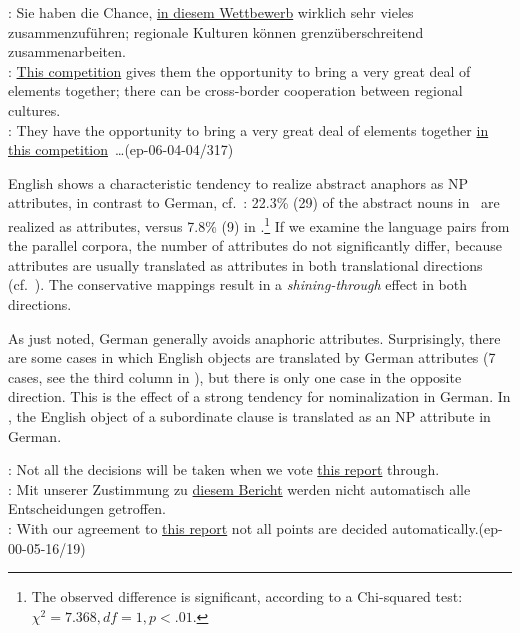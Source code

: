\documentclass[output=paper]{LSP/langsci}
\begin{document}
\ea	\label{ex:AdvToSub} %
\DEo :  Sie haben die Chance, \ul{in diesem Wettbewerb} wirklich sehr vieles zusammenzuf\"uhren; regionale Kulturen k\"onnen grenz\"uberschreitend zusammenarbeiten.\ \\
\ENt : \ul{This competition} gives them the opportunity to bring a very great deal of elements together; there can be cross-border cooperation between regional cultures.\\
\DElit : They have the opportunity to bring a very great deal of elements together \ul{in this competition}~\dots \hfill{(ep-06-04-04/317)}
\z

English shows a characteristic tendency to realize abstract anaphors as NP attributes, in contrast to German, cf.\ : 22.3\% (29) of the abstract nouns in \ENo\ are realized as attributes, versus 7.8\% (9) in  \DEo.\footnote{The observed difference is significant, according to a Chi-squared test: $\chi^2=7.368, df=1, p<.01$.} %
 If we examine the language pairs from the parallel corpora, the number of attributes do not  significantly differ, because attributes are usually translated as attributes in both translational directions (cf.\ ). The conservative mappings result in a \textit{shining-through} effect in both directions.

As just noted, German generally avoids anaphoric attributes. Surprisingly, there are some cases in which English objects are translated by German attributes (7 cases, see the third column in ), but there is only one case in the opposite  direction. This is the effect of a strong tendency for nominalization in German. In , the English object of a subordinate clause is translated as an NP attribute in German.  

\ea	\label{ex:ObjtoAttr} %
\ENo: Not all the decisions will be taken when we vote \ul{this report} through.\\
\DEt: Mit unserer Zustimmung zu \ul{diesem Bericht} werden nicht automatisch alle Entscheidungen getroffen.\\
\DElit: With our agreement to \ul{this report} not all points are decided automatically.\hfill{(ep-00-05-16/19)}
\z
\end{document}
